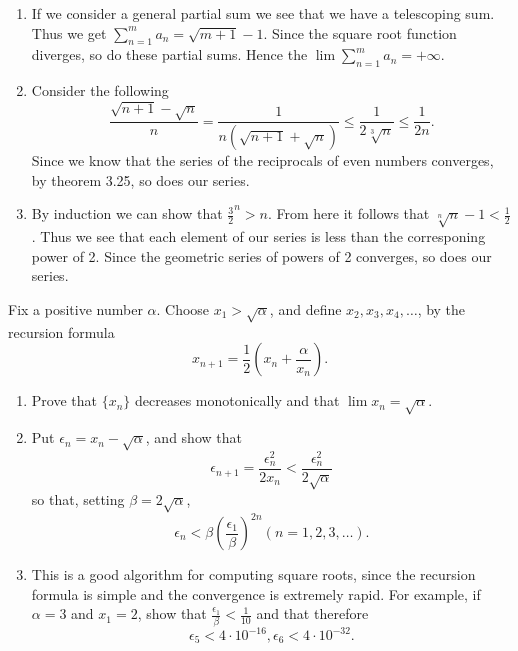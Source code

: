 \begin{solution}
  \begin{enumerate}[label=(\alph*)]
    \item If we consider a general partial sum we see that we have a telescoping sum.
      Thus we get $\sum_{n = 1}^m a_n = \sqrt{m + 1} - 1$.
      Since the square root function diverges, so do these partial sums.
      Hence the $\lim \sum_{n = 1}^{m} a_n = + \infty$.
    \item Consider the following
      \[\frac{\sqrt{n + 1} - \sqrt{n}}{n} = \frac{1}{n (\sqrt{n + 1} + \sqrt{n})} \le \frac{1}{2 \sqrt[3]{n}} \le \frac{1}{2 n}.\]
      Since we know that the series of the reciprocals of even numbers converges, by theorem 3.25, so does our series.
    \item By induction we can show that $\frac{3}{2}^n > n$.
      From here it follows that $\sqrt[n]{n} - 1 < \frac{1}{2}$.
      Thus we see that each element of our series is less than the corresponing power of 2.
      Since the geometric series of powers of 2 converges, so does our series.
  \end{enumerate}
\end{solution}

\setcounter{problem}{15}
\begin{problem}
  Fix a positive number $\alpha$.
  Choose $x_1 > \sqrt{\alpha}$, and define $x_2, x_3, x_4, \ldots$, by the recursion formula
  \[x_{n + 1} = \frac{1}{2} (x_n + \frac{\alpha}{x_n}).\]
  \begin{enumerate}[label=(\alph*)]
    \item Prove that $\{x_n\}$ decreases monotonically and that $\lim x_n = \sqrt{\alpha}$.
    \item Put $\epsilon_n = x_n - \sqrt{\alpha}$, and show that
      \[\epsilon_{n + 1} = \frac{\epsilon_n^2}{2x_n} < \frac{\epsilon_n^2}{2\sqrt{\alpha}}\]
      so that, setting $\beta = 2\sqrt{\alpha}$,
      \[\epsilon_n < \beta (\frac{\epsilon_1}{\beta})^{2n}  (n = 1, 2, 3, \ldots).\]
    \item This is a good algorithm for computing square roots, since the recursion formula is simple and the convergence is extremely rapid.
      For example, if $\alpha = 3$ and $x_1 = 2$, show that $\frac{\epsilon_1}{\beta} < \frac{1}{10}$ and that therefore
      \[\epsilon_5 < 4 \cdot 10^{-16},  \epsilon_6 < 4 \cdot 10^{-32}.\]
  \end{enumerate}
\end{problem}

